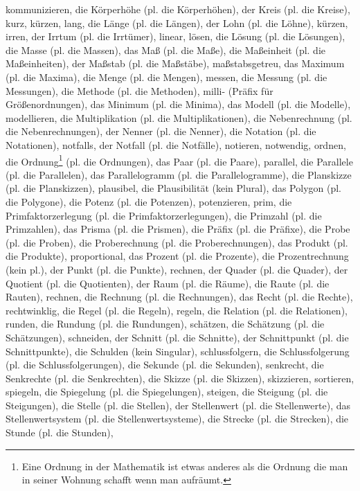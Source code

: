 kommunizieren,
die Körperhöhe (pl. die Körperhöhen),
der Kreis (pl. die Kreise),
kurz,
kürzen,
lang,
die Länge (pl. die Längen),
der Lohn (pl. die Löhne),
kürzen,
irren,
der Irrtum (pl. die Irrtümer),
linear,
lösen,
die Lösung (pl. die Lösungen),
die Masse (pl. die Massen),
das Maß (pl. die Maße),
die Maßeinheit (pl. die Maßeinheiten),
der Maßstab (pl. die Maßstäbe),
maßstabsgetreu,
das Maximum (pl. die Maxima),
die Menge (pl. die Mengen),
messen,
die Messung (pl. die Messungen),
die Methode (pl. die Methoden),
milli- (Präfix für Größenordnungen),
das Minimum (pl. die Minima),
das Modell (pl. die Modelle),
modellieren,
die Multiplikation (pl. die Multiplikationen),
die Nebenrechnung (pl. die Nebenrechnungen),
der Nenner (pl. die Nenner),
die Notation (pl. die Notationen),
notfalls,
der Notfall (pl. die Notfälle),
notieren,
notwendig,
ordnen,
die Ordnung\footnote{Eine Ordnung in der Mathematik ist etwas anderes als die Ordnung die man in seiner Wohnung schafft wenn man aufräumt.} (pl. die Ordnungen),
das Paar (pl. die Paare),
parallel,
die Parallele (pl. die Parallelen),
das Parallelogramm (pl. die Parallelogramme),
die Planskizze (pl. die Planskizzen),
plausibel,
die Plausibilität (kein Plural),
das Polygon (pl. die Polygone),
die Potenz (pl. die Potenzen),
potenzieren,
prim,
die Primfaktorzerlegung (pl. die Primfaktorzerlegungen),
die Primzahl (pl. die Primzahlen),
das Prisma (pl. die Prismen),
die Präfix (pl. die Präfixe),
die Probe (pl. die Proben),
die Proberechnung (pl. die Proberechnungen),
das Produkt (pl. die Produkte),
proportional,
das Prozent (pl. die Prozente),
die Prozentrechnung (kein pl.),
der Punkt (pl. die Punkte),
rechnen,
der Quader (pl. die Quader),
der Quotient (pl. die Quotienten),
der Raum (pl. die Räume),
die Raute (pl. die Rauten),
rechnen,
die Rechnung (pl. die Rechnungen),
das Recht (pl. die Rechte),
rechtwinklig,
die Regel (pl. die Regeln),
regeln,
die Relation (pl. die Relationen),
runden,
die Rundung (pl. die Rundungen),
schätzen,
die Schätzung (pl. die Schätzungen),
schneiden,
der Schnitt (pl. die Schnitte),
der Schnittpunkt (pl. die Schnittpunkte),
die Schulden (kein Singular),
schlussfolgern,
die Schlussfolgerung (pl. die Schlussfolgerungen),
die Sekunde (pl. die Sekunden),
senkrecht,
die Senkrechte (pl. die Senkrechten),
die Skizze (pl. die Skizzen),
skizzieren,
sortieren,
spiegeln,
die Spiegelung (pl. die Spiegelungen),
steigen,
die Steigung (pl. die Steigungen),
die Stelle (pl. die Stellen),
der Stellenwert (pl. die Stellenwerte),
das Stellenwertsystem (pl. die Stellenwertsysteme),
die Strecke (pl. die Strecken),
die Stunde (pl. die Stunden),
